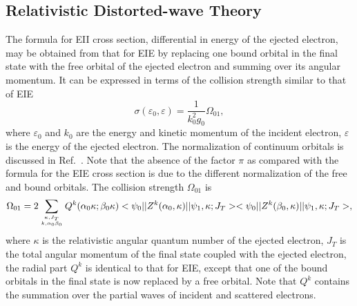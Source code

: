 \documentclass[preprint, floatfix, pra, showpacs, showkeys]{revtex4}
\begin{document}
\subsection{Relativistic Distorted-wave Theory}
The formula for EII cross section, differential in energy of the ejected
electron, may be obtained from that for EIE by replacing one bound orbital in
the final state with the free orbital of the ejected electron and summing 
over its angular momentum. It can be expressed in terms of the collision
strength similar to that of EIE 
\begin{equation}
\label{eq_cross}
\sigma(\varepsilon_0,\varepsilon) = \frac{1}{k_0^2g_0}\Omega_{01},
\end{equation}
where $\varepsilon_0$ and $k_0$ are the energy and kinetic momentum of the
incident electron, $\varepsilon$ is the energy of the ejected electron. The
normalization of continuum orbitals is discussed in Ref.~\cite{gu02b}. Note
that the absence of the 
factor $\pi$ as compared with the formula for the EIE cross section is due to
the different normalization of the free and bound orbitals. The collision
strength $\Omega_{01}$ is \cite{gu02b}
\begin{equation}
\label{eq_cs}
\Omega_{01} = 2\sum_{\kappa,J_T\atop k,\alpha_0\beta_0}
Q^k(\alpha_0\kappa;\beta_0\kappa)
<\psi_0||Z^k(\alpha_0,\kappa)||\psi_1,\kappa;J_T>
<\psi_0||Z^k(\beta_0,\kappa)||\psi_1,\kappa;J_T>,
\end{equation}
where $\kappa$ is the relativistic angular quantum number of the ejected
electron, $J_T$ is the total angular momentum of the final state coupled with
the ejected electron,
the radial part $Q^k$ is identical to that for EIE, except that one of
the bound orbitals in the final state is now replaced by a free orbital. Note
that $Q^k$ contains the summation over the partial waves of incident and
scattered electrons.
\end{document}
